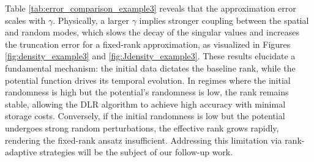 \documentclass[preprint,11pt]{elsarticle}
\newcommand{\ZY}[1]{\textcolor{orange}{~#1}}
\begin{document}
Table \ref{tab:error_comparison_example3} reveals that the approximation error scales with $\gamma$. Physically, a larger $\gamma$ implies stronger coupling between the spatial and random modes, which slows the decay of the singular values and increases the truncation error for a fixed-rank approximation, as visualized in Figures \ref{fig:density_example3} and \ref{fig:Jdensity_example3}. These results elucidate a fundamental mechanism: the initial data dictates the baseline rank, while the potential function drives its temporal evolution. In regimes where the initial randomness is high but the potential's randomness is low, the rank remains stable, allowing the DLR algorithm to achieve high accuracy with minimal storage costs. Conversely, if the initial randomness is low but the potential undergoes strong random perturbations, the effective rank grows rapidly, rendering the fixed-rank ansatz insufficient. Addressing this limitation via rank-adaptive strategies will be the subject of our follow-up work.




\end{document}
